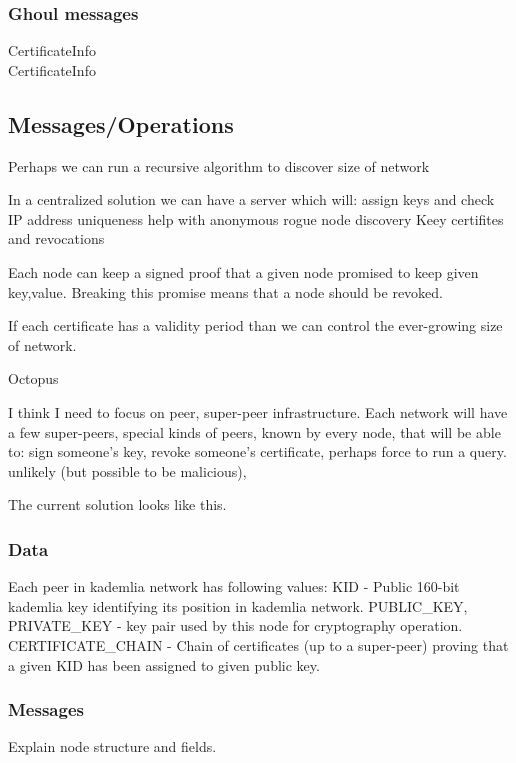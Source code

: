 \subsubsection{Ghoul messages}
\begin{description}
  \item[CertificateInfo]   
  \item[CertificateInfo]   
\end{description}

\subsection{Messages/Operations}

Perhaps we can run a recursive algorithm to discover size of network

In a centralized solution we can have a server which will:
  assign keys and check IP address uniqueness
  help with anonymous rogue node discovery
  Keey certifites and revocations

Each node can keep a signed proof that a given node promised to keep given
key,value. Breaking this promise means that a node should be revoked.

If each certificate has a validity period than we can control the ever-growing
size of network.

Octopus

I think I need to focus on peer, super-peer infrastructure. Each network will
have a few super-peers, special kinds of peers, known by every node, that will
be able to: sign someone's key, revoke someone's certificate, perhaps force to
run a query.
unlikely (but possible to be malicious), 

The current solution looks like this.

\subsubsection{Data}
Each peer in kademlia network has following values:
KID - Public 160-bit kademlia key identifying its position in kademlia network.
PUBLIC\_KEY, PRIVATE\_KEY - key pair used by this node for cryptography operation.
CERTIFICATE\_CHAIN - Chain of certificates (up to a super-peer) proving that a
given KID has been assigned to given public key.

\subsubsection{Messages}
Explain node structure and fields.

